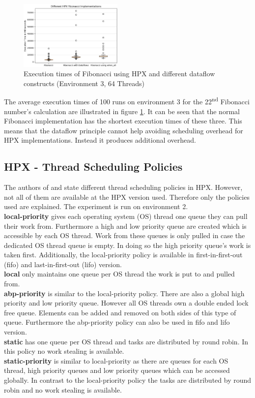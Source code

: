 \begin{figure}[h]
	\centering
	\includegraphics[width=0.45\textwidth]{figures/fibDataflow.JPG}
	\caption{Execution times of Fibonacci using HPX and different dataflow constructs (Environment 3, 64 Threads)}
	\label{fig:fib_dataflow}
\end{figure}

The average execution times of 100 runs on environment 3 for the 22\textsuperscript{nd} Fibonacci number's calculation are illustrated in figure \ref{fig:fib_dataflow}.
It can be seen that the normal Fibonacci implementation has the shortest execution times of these three.
This means that the dataflow principle cannot help avoiding scheduling overhead for HPX implementations.
Instead it produces additional overhead.


\subsection{HPX - Thread Scheduling Policies}
 The authors of \cite{hpxMP.2019} and \cite{TheSTEARGroup.2020} state different thread scheduling policies in HPX.
 However, not all of them are available at the HPX version used.
 Therefore only the policies used are explained.
 The experiment is run on environment 2.\\
 \textbf{local-priority} gives each operating system (OS) thread one queue they can pull their work from.
 Furthermore a high and low priority queue are created which is accessible by each OS thread.
 Work from these queues is only pulled in case the dedicated OS thread queue is empty.
 In doing so the high priority queue's work is taken first.
 Additionally, the local-priority policy is available in first-in-first-out (fifo) and last-in-first-out (lifo) version.\\
 \textbf{local} only maintains one queue per OS thread the work is put to and pulled from.\\
 \textbf{abp-priority} is similar to the local-priority policy.
 There are also a global high priority and low priority queue.
 However all OS threads own a double ended lock free queue.
 Elements can be added and removed on both sides of this type of queue.
 Furthermore the abp-priority policy can also be used in fifo and lifo version.\\
 \textbf{static} has one queue per OS thread and tasks are distributed by round robin.
 In this policy no work stealing is available.\\
 \textbf{static-priority} is similar to local-priority as there are queues for each OS thread, high priority queues and low priority queues which can be accessed globally.
 In contrast to the local-priority policy the tasks are distributed by round robin and no work stealing is available.

